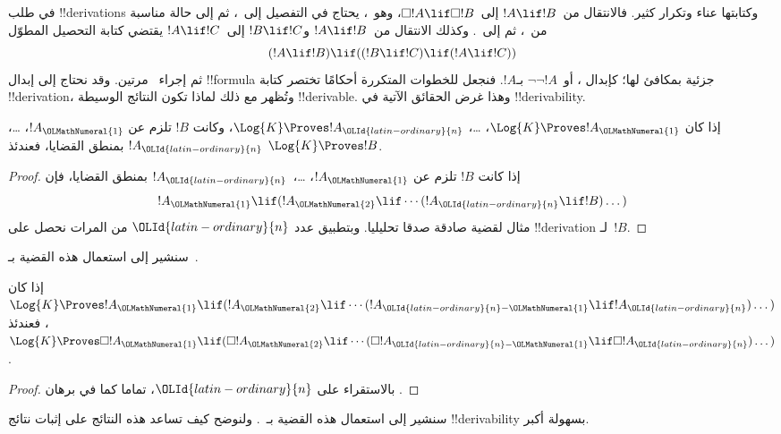 \documentclass[../../../include/open-logic-section]{subfiles}
\begin{document}


في طلب !!{derivation}s وكتابتها عناء وتكرار كثير.
فالانتقال من~$!A \lif !B$ إلى~$\Box !A \lif \Box !B$، وهو~\RK،
يحتاج في التفصيل إلى~\Nec، ثم إلى حالة مناسبة من~،
ثم إلى~\MP. وكذلك الانتقال من~$!A \lif !B$ و$!B \lif !C$
إلى~$!A \lif !C$ يقتضي كتابة التحصيل المطوّل
\[
(!A \lif !B) \lif ((!B \lif !C) \lif (!A \lif !C))
\]
ثم إجراء~\MP{} مرتين. وقد نحتاج إلى إبدال !!{formula} جزئية
بمكافئ لها؛ كإبدال ،
أو~$\lnot\lnot !A$ بـ$!A$. فنجعل للخطوات المتكررة أحكامًا
تختصر كتابة !!{derivation}، وتُظهر مع ذلك لماذا تكون النتائج
الوسيطة !!{derivable}. وهذا غرض الحقائق الآتية في !!{derivability}.

\begin{prop}
  إذا كان $\Log{K} \Proves !A_\OLMathNumeral{1}$، \dots، $\Log{K} \Proves !A_\OLId{latin-ordinary}{n}$،
  وكانت $!B$ تلزم عن $!A_\OLMathNumeral{1}$، \dots، $!A_\OLId{latin-ordinary}{n}$ بمنطق القضايا، فعندئذ
  $\Log{K} \Proves !B$.
\end{prop}

\begin{proof}
  إذا كانت $!B$ تلزم عن $!A_\OLMathNumeral{1}$، \dots،~$!A_\OLId{latin-ordinary}{n}$ بمنطق القضايا، فإن
  \[
  !A_\OLMathNumeral{1} \lif (!A_\OLMathNumeral{2} \lif \cdots (!A_\OLId{latin-ordinary}{n} \lif !B)\dots)
  \]
  مثال لقضية صادقة صدقا تحليليا. وبتطبيق \MP{} عدد $\OLId{latin-ordinary}{n}$ من المرات
  نحصل على !!{derivation} لـ~$!B$.
\end{proof}

سنشير إلى استعمال هذه القضية بـ~\PL.

\begin{prop}
  إذا كان $\Log{K} \Proves !A_\OLMathNumeral{1} \lif (!A_\OLMathNumeral{2} \lif \cdots (!A_{\OLId{latin-ordinary}{n}-\OLMathNumeral{1}} \lif
  !A_\OLId{latin-ordinary}{n})\dots)$، فعندئذ $\Log{K} \Proves \Box !A_\OLMathNumeral{1} \lif (\Box !A_\OLMathNumeral{2} \lif
  \cdots (\Box !A_{\OLId{latin-ordinary}{n}-\OLMathNumeral{1}} \lif \Box !A_\OLId{latin-ordinary}{n})\dots)$.
\end{prop}

\begin{proof}
  بالاستقراء على $\OLId{latin-ordinary}{n}$، تماما كما في برهان .
\end{proof}

سنشير إلى استعمال هذه القضية بـ~\RK. ولنوضح كيف تساعد هذه النتائج
على إثبات نتائج !!{derivability} بسهولة أكبر.
\end{document}

